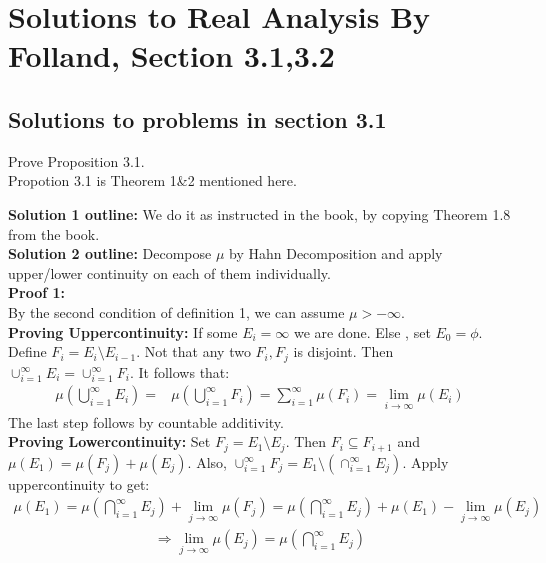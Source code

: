 \documentclass[notoc]{tufte-book}
\begin{document}
\section{Solutions to Real Analysis By Folland, Section 3.1,3.2}
\subsection{Solutions to problems in section 3.1}
\begin{tcolorbox}[colback=c4,colframe=c3,title=Problem 3.1]
	Prove Proposition 3.1.\\\noindent
	{Propotion 3.1} is Theorem 1\&2 mentioned here.
\end{tcolorbox}\noindent
\textbf{Solution 1 outline:} We do it as instructed in the book, by copying Theorem 1.8 from the book.\\
\textbf{Solution 2 outline:} Decompose $\mu$ by Hahn Decomposition and apply upper/lower continuity on each of them  individually.\\
\textbf{Proof 1:}\\\noindent
By the second condition of definition 1, we can assume $\mu>-\infty$.\\ 
\noindent \textbf{Proving Uppercontinuity:} If some $E_i=\infty$ we are done. Else , set $E_0=\phi$. Define $F_i=E_i\setminus E_{i-1}$. Not that any two $F_i,F_j$ is disjoint. Then $\cup_{i=1}^\infty E_i= \cup_{i=1}^\infty F_i$. It follows that:
\begin{align*}
	\mu\left(\bigcup_{i=1}^\infty E_i\right)=&\mu\left(\bigcup_{i=1}^\infty F_i\right)
	=\sum_{i=1}^\infty \mu\left(F_i\right)=\lim_{i\to\infty}\mu(E_i)
\end{align*}
The last step follows by countable additivity.\\\noindent
\noindent \textbf{Proving Lowercontinuity:}
Set $F_j=E_1\setminus E_j$. Then $F_i\subseteq F_{i+1}$ and $\mu(E_1)=\mu(F_j)+\mu(E_j)$. Also, $\cup_{i=1}^\infty F_j=E_1\setminus(\cap_{i=1}^\infty E_j)$. Apply uppercontinuity to get: 
\begin{align*}
	\mu(E_1)=\mu\left(\bigcap_{i=1}^\infty E_j\right)+\lim_{j\to\infty}\mu(F_j)=\mu\left(\bigcap_{i=1}^\infty E_j\right)+\mu(E_1)-\lim_{j\to\infty}\mu(E_j)
\end{align*}
\begin{align*}
	\Rightarrow \lim_{j\to\infty}\mu(E_j)=\mu\left(\bigcap_{i=1}^\infty E_j\right)
\end{align*}
\end{document}

